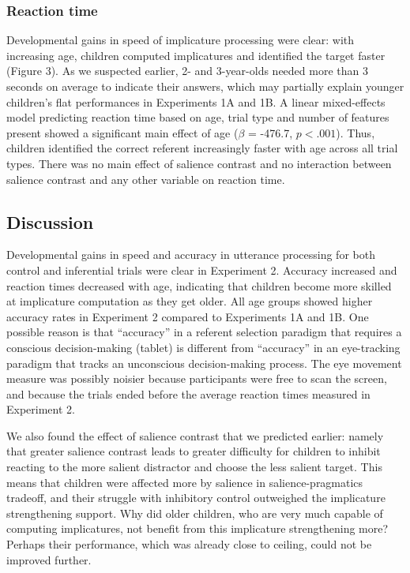 \documentclass[a4paper,man,apacite,floatsintext]{apa6}
\begin{document}
\subsubsection{Reaction time}\label{reaction-time}

Developmental gains in speed of implicature processing were clear: with
increasing age, children computed implicatures and identified the target
faster (Figure 3). As we suspected earlier, 2- and 3-year-olds needed
more than 3 seconds on average to indicate their answers, which may
partially explain younger children's flat performances in Experiments 1A
and 1B. A linear mixed-effects model predicting reaction time based on
age, trial type and number of features present showed a significant main
effect of age (\(\beta\) = -476.7, \(p < .001\)). Thus, children
identified the correct referent increasingly faster with age across all
trial types. There was no main effect of salience contrast and no
interaction between salience contrast and any other variable on reaction
time.

\subsection{Discussion}\label{discussion-2}

Developmental gains in speed and accuracy in utterance processing for
both control and inferential trials were clear in Experiment 2. Accuracy
increased and reaction times decreased with age, indicating that
children become more skilled at implicature computation as they get
older. All age groups showed higher accuracy rates in Experiment 2
compared to Experiments 1A and 1B. One possible reason is that
``accuracy'' in a referent selection paradigm that requires a conscious
decision-making (tablet) is different from ``accuracy'' in an
eye-tracking paradigm that tracks an unconscious decision-making
process. The eye movement measure was possibly noisier because
participants were free to scan the screen, and because the trials ended
before the average reaction times measured in Experiment 2.

We also found the effect of salience contrast that we predicted earlier:
namely that greater salience contrast leads to greater difficulty for
children to inhibit reacting to the more salient distractor and choose
the less salient target. This means that children were affected more by
salience in salience-pragmatics tradeoff, and their struggle with
inhibitory control outweighed the implicature strengthening support. Why
did older children, who are very much capable of computing implicatures,
not benefit from this implicature strengthening more? Perhaps their
performance, which was already close to ceiling, could not be improved
further.
\end{document}
